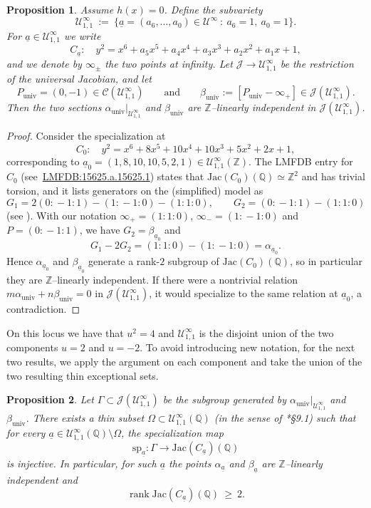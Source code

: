\documentclass{amsart}
\newcommand{\Q}{{\mathbb Q}}
\newcommand{\Z}{{\mathbb Z}}
\newcommand{\cC}{\mathcal{C}}
\newcommand{\cJ}{\mathcal{J}}
\newcommand{\cU}{\mathcal{U}}
\newcommand{\Jac}{\mathrm{Jac}}
\newcommand{\ua}{\underline{a}}
\DeclareMathOperator{\rank}{\mathrm{rank}}
\newtheorem{proposition}{Proposition}[section]
\begin{document}
\begin{proposition}\label{prop:rank2-independence-generic}
Assume $h(x)=0$.  Define the subvariety
\[
\cU^{\infty}_{1,1}\ :=\ \bigl\{\ua=(a_6,\dots,a_0)\in \cU^{\infty}\ :\ a_6=1,\ a_0=1\bigr\}.
\]
For $\ua\in \cU^{\infty}_{1,1}$ we write
\[
C_{\ua}:\quad y^2=x^6+a_5x^5+a_4x^4+a_3x^3+a_2x^2+a_1x+1,
\]
and we denote by $\infty_{\pm}$ the two points at infinity.  Let $\cJ\to \cU^{\infty}_{1,1}$
be the restriction of the universal Jacobian, and let
\[
P_{\mathrm{univ}}=(0,-1)\in \cC(\cU^{\infty}_{1,1})
\qquad\text{and}\qquad
\beta_{\mathrm{univ}}:=[P_{\mathrm{univ}}-\infty_{+}]\in \cJ(\cU^{\infty}_{1,1}).
\]
Then the two sections $\alpha_{\mathrm{univ}}|_{\cU^{\infty}_{1,1}}$ and $\beta_{\mathrm{univ}}$
are $\Z$--linearly independent in $\cJ(\cU^{\infty}_{1,1})$.
\end{proposition}

\begin{proof}
Consider the specialization at
\[
C_{0}:\quad y^2=x^6+8x^5+10x^4+10x^3+5x^2+2x+1,
\]
corresponding to $\ua_0=(1,8,10,10,5,2,1)\in \cU^{\infty}_{1,1}(\Z)$.
The LMFDB entry for $C_0$ (see~\href{https://www.lmfdb.org/Genus2Curve/Q/15625/a/15625/1}{LMFDB:15625.a.15625.1}) states that
$\Jac(C_0)(\Q)\simeq \Z^2$ and has trivial torsion, and it lists generators on the (simplified)
model as
\[
G_1=2(0\!:\!-1\!:\!1)-(1\!:\!-1\!:\!0)-(1\!:\!1\!:\!0),
\qquad
G_2=(0\!:\!-1\!:\!1)-(1\!:\!1\!:\!0)
\]
(see \cite{LMFDB}).
With our notation $\infty_{+}=(1\!:\!1\!:\!0)$, $\infty_{-}=(1\!:\!-1\!:\!0)$ and
$P=(0\!:\!-1\!:\!1)$, we have $G_2=\beta_{\ua_0}$ and
\[
G_1-2G_2=(1\!:\!1\!:\!0)-(1\!:\!-1\!:\!0)=\alpha_{\ua_0}.
\]
Hence $\alpha_{\ua_0}$ and $\beta_{\ua_0}$ generate a rank-$2$ subgroup of $\Jac(C_0)(\Q)$,
so in particular they are $\Z$--linearly independent.
If there were a nontrivial relation $m\alpha_{\mathrm{univ}}+n\beta_{\mathrm{univ}}=0$ in
$\cJ(\cU^{\infty}_{1,1})$, it would specialize to the same relation at $\ua_0$, a contradiction.
\end{proof}

On this locus we have that $u^2=4$ and $\cU^\infty_{1,1}$ is the disjoint union
of the two components $u=2$ and $u=-2$. To avoid introducing new notation, for the next two results, we apply the argument on each
component and take the union of the two resulting thin exceptional sets.

\begin{proposition}\label{prop:rank2-thin}
Let $\Gamma\subset \cJ(\cU^{\infty}_{1,1})$ be the subgroup generated by
$\alpha_{\mathrm{univ}}|_{\cU^{\infty}_{1,1}}$ and $\beta_{\mathrm{univ}}$.
There exists a thin subset $\Omega\subset \cU^{\infty}_{1,1}(\Q)$ (in the sense of
\cite{SerreMW}*{\S9.1}) such that for every $\ua\in \cU^{\infty}_{1,1}(\Q)\setminus \Omega$,
the specialization map
\[
\mathrm{sp}_{\ua}:\Gamma\longrightarrow \Jac(C_{\ua})(\Q)
\]
is injective. In particular, for such $\ua$ the points $\alpha_{\ua}$ and $\beta_{\ua}$ are
$\Z$--linearly independent and
\[
\rank\Jac(C_{\ua})(\Q)\ \ge\ 2.
\]
\end{proposition}
\end{document}
